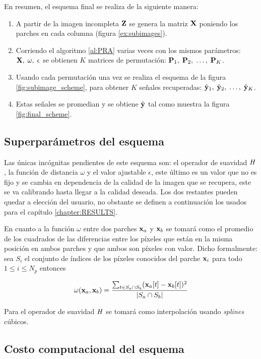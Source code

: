 En resumen, el esquema final se realiza de la siguiente manera:
\begin{enumerate}
	\item A partir de la imagen incompleta $\Z$ se genera la matriz $\X$ poniendo los parches en cada columna (figura \ref{ex:subimages}).
	\item Corriendo el algoritmo \ref{al:PRA} varias veces con los mismos par\'ametros: $\X,\; \omega,\; \epsilon$ se obtienen $K$ matrices de permutaci\'on: $\P_1,\; \P_2,\; \dots,\; \P_K$.
	\item Usando cada permutaci\'on una vez se realiza el esquema de la figura \ref{fig:subimage_scheme}, para obtener $K$ señales recuperadas: $\yhat_1,\; \yhat_2,\; \dots,\; \yhat_K$. 
	\item Estas señales se promedian y se obtiene $\yhat$ tal como muestra la figura \ref{fig:final_scheme}.
\end{enumerate}

\subsection{Superpar\'ametros del esquema}
Las \'unicas incógnitas pendientes de este esquema son: el operador de suavidad $\H$, la funci\'on de distancia $\omega$ y el valor ajustable $\epsilon$, este \'ultimo es un valor que no es fijo y se cambia en dependencia de la calidad de la imagen que se recupera, este se va calibrando hasta llegar a la calidad deseada. Los dos restantes pueden quedar a elecci\'on del usuario, no obstante se definen a continuaci\'on los usados para el cap\'itulo \ref{chapter:RESULTS}.

En cuanto a la funci\'on $\omega$ entre dos parches $\x_a$ y $\x_b$ se tomar\'a como el promedio de los cuadrados de las diferencias entre los p\'ixeles que est\'an en la misma posici\'on en ambos parches y que ambos son p\'ixeles con valor. Dicho formalmente: sea $S_i$ el conjunto de \'indices de los p\'ixeles conocidos del parche $\x_i$ para todo $1 \le i \le N_p$ entonces

\begin{equation}
\omega(\x_a, \x_b) = \frac{\sum_{t \in S_a \cap S_b} (\x_a[t] - \x_b[t])^2}{|S_a \cap S_b|}
\end{equation}

Para el operador de suavidad $\H$ se tomar\'a como interpolaci\'on usando \textit{splines} c\'ubicos.

\subsection{Costo computacional del esquema}

